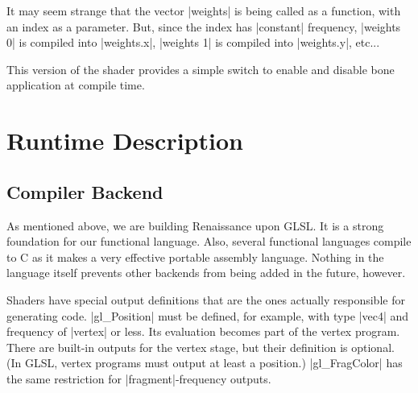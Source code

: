 \documentclass{acmsiggraph}               %
\begin{document}
It may seem strange that the vector |weights| is being called as a
function, with an index as a parameter.  But, since the index has
|constant| frequency, |weights 0| is compiled into |weights.x|,
|weights 1| is compiled into |weights.y|, etc...

This version of the shader provides a simple switch to enable and
disable bone application at compile time.

\section{Runtime Description}

\subsection{Compiler Backend}

As mentioned above, we are building Renaissance upon GLSL.  It is a
strong foundation for our functional language.  Also, several
functional languages compile to C as it makes a very effective
portable assembly language.  Nothing in the language itself prevents
other backends from being added in the future, however.

Shaders have special output definitions that are the ones actually
responsible for generating code.  |gl_Position| must be defined, for
example, with type |vec4| and frequency of |vertex| or less.  Its
evaluation becomes part of the vertex program.  There are built-in
outputs for the vertex stage, but their definition is optional.  (In
GLSL, vertex programs must output at least a position.)
|gl_FragColor| has the same restriction for |fragment|-frequency
outputs.
\end{document}

